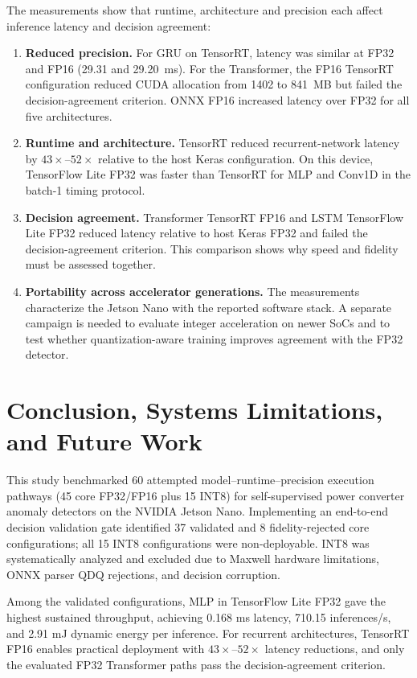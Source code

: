 \documentclass[11pt,a4paper]{article}
\begin{document}
The measurements show that runtime, architecture and precision each affect inference latency and decision agreement:
\begin{enumerate}
    \item \textbf{Reduced precision.} For GRU on TensorRT, latency was similar at FP32 and FP16 (29.31 and 29.20~ms). For the Transformer, the FP16 TensorRT configuration reduced CUDA allocation from 1402 to 841~MB but failed the decision-agreement criterion. ONNX FP16 increased latency over FP32 for all five architectures.
    \item \textbf{Runtime and architecture.} TensorRT reduced recurrent-network latency by $43\times$--$52\times$ relative to the host Keras configuration. On this device, TensorFlow Lite FP32 was faster than TensorRT for MLP and Conv1D in the batch-1 timing protocol.
    \item \textbf{Decision agreement.} Transformer TensorRT FP16 and LSTM TensorFlow Lite FP32 reduced latency relative to host Keras FP32 and failed the decision-agreement criterion. This comparison shows why speed and fidelity must be assessed together.
    \item \textbf{Portability across accelerator generations.} The measurements characterize the Jetson Nano with the reported software stack. A separate campaign is needed to evaluate integer acceleration on newer SoCs and to test whether quantization-aware training improves agreement with the FP32 detector.
\end{enumerate}

\section{Conclusion, Systems Limitations, and Future Work}
\label{sec:conclusion}

This study benchmarked 60 attempted model--runtime--precision execution pathways (45 core FP32/FP16 plus 15 INT8) for self-supervised power converter anomaly detectors on the NVIDIA Jetson Nano. Implementing an end-to-end decision validation gate identified 37 validated and 8 fidelity-rejected core configurations; all 15 INT8 configurations were non-deployable. INT8 was systematically analyzed and excluded due to Maxwell hardware limitations, ONNX parser QDQ rejections, and decision corruption. 

Among the validated configurations, MLP in TensorFlow Lite FP32 gave the highest sustained throughput, achieving 0.168 ms latency, 710.15 inferences/s, and 2.91 mJ dynamic energy per inference. For recurrent architectures, TensorRT FP16 enables practical deployment with $43\times$--$52\times$ latency reductions, and only the evaluated FP32 Transformer paths pass the decision-agreement criterion.
\end{document}

